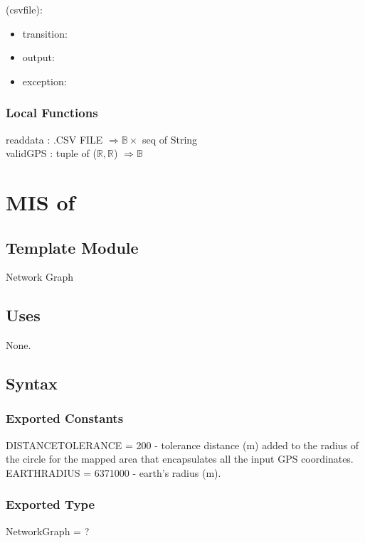 \documentclass[12pt, titlepage]{article}
\begin{document}
\noindent {}(csvfile):
\begin{itemize}
\item transition:  
\item output:  
\item exception:  
\end{itemize}

\subsubsection{Local Functions}

readdata : .CSV FILE $ \Rightarrow \mathbb{B} \times $ seq of String\\
validGPS : tuple of ($\mathbb{R},\mathbb{R}$) $\Rightarrow \mathbb{B}$ 

\newpage

\section{MIS of } \label{Module} 

\subsection{Template Module}
Network Graph

\subsection{Uses}
None.

\subsection{Syntax}

\subsubsection{Exported Constants}
DISTANCETOLERANCE = 200 - tolerance distance (m) added to the radius of the circle for the mapped area that encapsulates all the input GPS coordinates. \\
EARTHRADIUS = 6371000 - earth's radius (m).

\subsubsection{Exported Type}
NetworkGraph = ?
\end{document}
